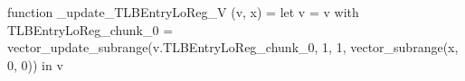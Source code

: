 function _update_TLBEntryLoReg_V (v, x) = let v = { v with TLBEntryLoReg_chunk_0 = vector_update_subrange(v.TLBEntryLoReg_chunk_0, 1, 1, vector_subrange(x, 0, 0)) } in v
